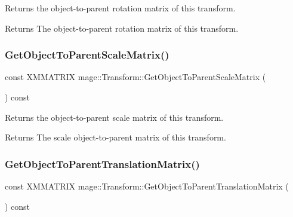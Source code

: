 Returns the object-\/to-\/parent rotation matrix of this transform.

\begin{DoxyReturn}{Returns}
The object-\/to-\/parent rotation matrix of this transform. 
\end{DoxyReturn}
\hypertarget{structmage_1_1_transform_a27c7ed867751be11143d6eb9b0578d52}{}\label{structmage_1_1_transform_a27c7ed867751be11143d6eb9b0578d52} 
\subsubsection{\texorpdfstring{Get\+Object\+To\+Parent\+Scale\+Matrix()}{GetObjectToParentScaleMatrix()}}
{\footnotesize\ttfamily const X\+M\+M\+A\+T\+R\+IX mage\+::\+Transform\+::\+Get\+Object\+To\+Parent\+Scale\+Matrix (\begin{DoxyParamCaption}{ }\end{DoxyParamCaption}) const\hspace{0.3cm}{\ttfamily [noexcept]}}

Returns the object-\/to-\/parent scale matrix of this transform.

\begin{DoxyReturn}{Returns}
The scale object-\/to-\/parent matrix of this transform. 
\end{DoxyReturn}
\hypertarget{structmage_1_1_transform_a7f9b6ae60fde68f06e3e57e2180af89c}{}\label{structmage_1_1_transform_a7f9b6ae60fde68f06e3e57e2180af89c} 
\subsubsection{\texorpdfstring{Get\+Object\+To\+Parent\+Translation\+Matrix()}{GetObjectToParentTranslationMatrix()}}
{\footnotesize\ttfamily const X\+M\+M\+A\+T\+R\+IX mage\+::\+Transform\+::\+Get\+Object\+To\+Parent\+Translation\+Matrix (\begin{DoxyParamCaption}{ }\end{DoxyParamCaption}) const\hspace{0.3cm}{\ttfamily [noexcept]}}


